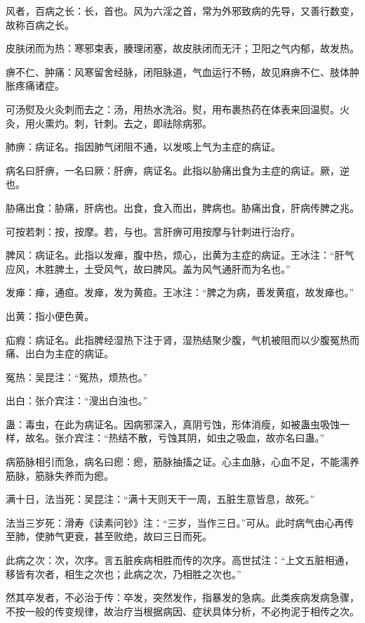 \documentclass[draft,12pt]{ctexbook}
\begin{document}

\begin{jiaozhu}
	\item 风者，百病之长：长，首也。风为六淫之首，常为外邪致病的先导，又善行数变，故称百病之长。
	\item 皮肤闭而为热：寒邪束表，腠理闭塞，故皮肤闭而无汗；卫阳之气内郁，故发热。
	\item 痹不仁、肿痛：风寒留舍经脉，闭阻脉道，气血运行不畅，故见麻痹不仁、肢体肿胀疼痛诸症。
	\item 可汤熨及火灸刺而去之：汤，用热水洗浴。熨，用布裹热药在体表来回温熨。火灸，用火熏灼。刺，针刺。去之，即祛除病邪。
	\item 肺痹：病证名。指因肺气闭阻不通，以发咳上气为主症的病证。
	\item 病名曰肝痹，一名曰厥：肝痹，病证名。此指以胁痛出食为主症的病证。厥，逆也。
	\item 胁痛出食：胁痛，肝病也。出食，食入而出，脾病也。胁痛出食，肝病传脾之兆。
	\item 可按若刺：按，按摩。若，与也。言肝痹可用按摩与针刺进行治疗。
	\item 脾风：病证名。此指以发瘅，腹中热，烦心，出黄为主症的病证。王冰注：“肝气应风，木胜脾土，土受风气，故曰脾风。盖为风气通肝而为名也。”
	\item 发瘅：瘅，通疸。发瘅，发为黄疸。王冰注：“脾之为病，善发黄疽，故发瘅也。”
	\item 出黄：指小便色黄。
	\item 疝瘕：病证名。此指脾经湿热下注于肾，湿热结聚少腹，气机被阻而以少腹冤热而痛、出白为主症的病证。
	\item 冤热：吴昆注：“冤热，烦热也。”
	\item 出白：张介宾注：“溲出白浊也。”
	\item 蛊：毒虫，在此为病证名。因病邪深入，真阴亏蚀，形体消瘦，如被蛊虫吸蚀一样，故名。张介宾注：“热结不散，亏蚀其阴，如虫之吸血，故亦名曰蛊。”
	\item 病筋脉相引而急，病名曰瘛：瘛，筋脉抽搐之证。心主血脉，心血不足，不能濡养筋脉，筋脉失养而为瘛。
	\item 满十日，法当死：吴昆注：“满十天则天干一周，五脏生意皆息，故死。”
	\item 法当三岁死：滑寿《读素问钞》注：“三岁，当作三日。”可从。此时病气由心再传至肺，使肺气更衰，甚至败绝，故曰三日而死。
	\item 此病之次：次，次序。言五脏疾病相胜而传的次序。高世拭注：“上文五脏相通，移皆有次者，相生之次也；此病之次，乃相胜之次也。”
	\item 然其卒发者，不必治于传：卒发，突然发作，指暴发的急病。此类疾病发病急骤，不按一般的传变规律，故治疗当根据病因、症状具体分析，不必拘泥于相传之次。

\end{jiaozhu}
\end{document}
